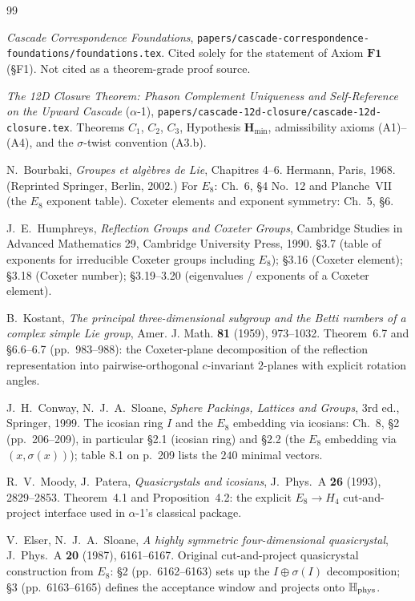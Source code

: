 \documentclass[11pt, a4paper]{amsart}
\theoremstyle{definition}
\newcommand{\HH}{\mathbb{H}}
\newcommand{\Hmin}{\mathbf{H}_{\min}}
\begin{document}
\begin{thebibliography}{99}

\emph{Cascade Correspondence Foundations},
\texttt{papers/cascade-correspondence-foundations/foundations.tex}.
Cited solely for the statement of Axiom $\mathbf{F1}$ (\S F1).
Not cited as a theorem-grade proof source.

\emph{The 12D Closure Theorem: Phason Complement Uniqueness
and Self-Reference on the Upward Cascade} ($\alpha$-1),
\texttt{papers/cascade-12d-closure/cascade-12d-closure.tex}.
Theorems $C_1$, $C_2$, $C_3$, Hypothesis $\Hmin$,
admissibility axioms (A1)--(A4), and the
$\sigma$-twist convention (A3.b).

N.~Bourbaki, \emph{Groupes et alg\`ebres de Lie}, Chapitres
4--6. Hermann, Paris, 1968. (Reprinted Springer, Berlin,
2002.) For $E_8$: Ch.~6, \S4 No.~12 and Planche~VII (the
$E_8$ exponent table). Coxeter elements and exponent
symmetry: Ch.~5, \S6.

J.~E.~Humphreys, \emph{Reflection Groups and Coxeter
Groups}, Cambridge Studies in Advanced Mathematics 29,
Cambridge University Press, 1990. \S 3.7 (table of
exponents for irreducible Coxeter groups including $E_8$);
\S 3.16 (Coxeter element); \S 3.18 (Coxeter number);
\S 3.19--3.20 (eigenvalues / exponents of a Coxeter
element).

B.~Kostant, \emph{The principal three-dimensional subgroup
and the Betti numbers of a complex simple Lie group}, Amer.
J. Math. \textbf{81} (1959), 973--1032. Theorem~6.7
and \S 6.6--6.7 (pp.~983--988): the
Coxeter-plane decomposition of the reflection
representation into pairwise-orthogonal $c$-invariant
$2$-planes with explicit rotation angles.

J.~H.~Conway, N.~J.~A.~Sloane, \emph{Sphere Packings,
Lattices and Groups}, 3rd ed., Springer, 1999. The icosian
ring $I$ and the $E_8$ embedding via icosians: Ch.~8,
\S2 (pp.~206--209), in particular \S 2.1 (icosian ring) and
\S 2.2 (the $E_8$ embedding via $(x, \sigma(x))$); table 8.1
on p.~209 lists the $240$ minimal vectors.

R.~V.~Moody, J.~Patera, \emph{Quasicrystals and icosians},
J.~Phys.~A \textbf{26} (1993), 2829--2853. Theorem~4.1 and
Proposition~4.2: the explicit $E_8 \to H_4$ cut-and-project
interface used in $\alpha$-1's classical package.

V.~Elser, N.~J.~A.~Sloane, \emph{A highly symmetric
four-dimensional quasicrystal}, J.~Phys.~A \textbf{20}
(1987), 6161--6167. Original cut-and-project quasicrystal
construction from $E_8$: \S 2 (pp.~6162--6163) sets up the
$I \oplus \sigma(I)$ decomposition; \S 3 (pp.~6163--6165)
defines the acceptance window and projects onto
$\HH_{\rm phys}$.


\end{thebibliography}
\end{document}
